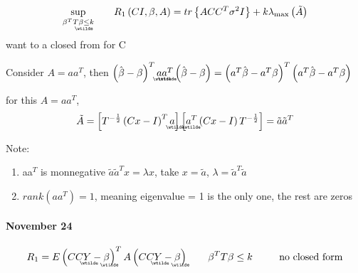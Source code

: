 \documentclass{article}
\begin{document}
\begin{equation}
\underset{\beta ^{T}T%
\underaccent{\wtilde}{\beta}%
\leq k}{\sup }\qquad R_{1}\left( CI,\beta ,A\right) =tr\left\{ ACC^{T}\sigma
^{2}I\right\} +k\lambda _{\max }\left( \tilde{A}\right) 
\end{equation}%
want to a closed from for C

\bigskip 

Consider $A=aa^{T}$, then $\left( \hat{\beta}-\beta \right) ^{T}%
\underaccent{\wtilde}{a}%
\underaccent{\wtilde}{a}%
^{T}\left( \hat{\beta}-\beta \right) =\left( a^{T}\hat{\beta}-a^{T}\beta
\right) ^{T}\left( a^{T}\hat{\beta}-a^{T}\beta \right) $

for this $A=aa^{T}$, 
\begin{equation}
\tilde{A}=\left[ T^{-\frac{1}{2}}\left( Cx-I\right) ^{T}%
\underaccent{\wtilde}{a}%
\right] \left[ 
\underaccent{\wtilde}{a}%
^{T}\left( Cx-I\right) T^{-\frac{1}{2}}\right] =\tilde{a}\tilde{a}^{T}
\end{equation}

Note:{}

\begin{enumerate}
\item aa$^{T}$ is monnegative $\tilde{a}\tilde{a}^{T}x=\lambda x$, take $x=%
\tilde{a}$, $\lambda =\tilde{a}^{T}\tilde{a}$

\item $rank\left( aa^{T}\right) =1$, meaning eigenvalue = 1 is the only one,
the rest are zeros
\end{enumerate}

\bigskip 

\paragraph{November 24}

\begin{equation*}
R_{1}=E\left( CC%
\underaccent{\wtilde}{Y}%
-%
\underaccent{\wtilde}{\beta}%
\right) ^{T}A\left( CC%
\underaccent{\wtilde}{Y}%
-%
\underaccent{\wtilde}{\beta}%
\right) \qquad \beta ^{T}T\beta \leq k\qquad \text{no closed form}
\end{equation*}%
\bigskip 
\end{document}
